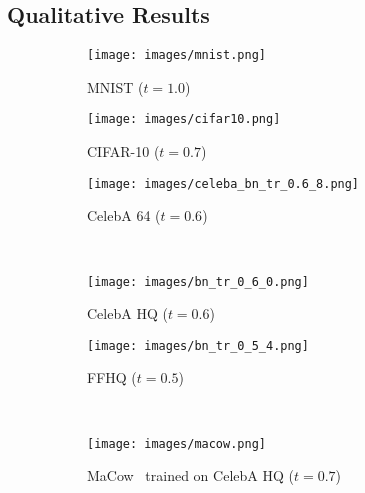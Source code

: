 \documentclass{article}
\begin{document}
\subsection{Qualitative Results}\label{sec:qual_res}
\begin{figure}[t]
\vspace{-0.5cm}
\centering
\begin{subfigure}[b]{.32\textwidth}
\centering
    \setlength{\belowcaptionskip}{1pt}
    \vspace{-0.4cm}
    \texttt{[image: images/mnist.png]}
    \caption{MNIST ($t = 1.0$)}
    \label{fig:mnist}
\end{subfigure}
\begin{subfigure}[b]{.32\textwidth}
\centering
    \setlength{\belowcaptionskip}{1pt}
    \vspace{-0.4cm}
    \texttt{[image: images/cifar10.png]}
    \caption{CIFAR-10 ($t = 0.7$)}
    \label{fig:cifar10}
\end{subfigure}
\begin{subfigure}[b]{.32\textwidth}
\centering
    \setlength{\belowcaptionskip}{1pt}
    \texttt{[image: images/celeba\_bn\_tr\_0.6\_8.png]}
    \caption{CelebA 64 ($t = 0.6$)}
    \label{fig:celeba64}
\end{subfigure} \\
\begin{subfigure}[b]{.49\textwidth}
\centering
    \setlength{\belowcaptionskip}{1pt}
    \texttt{[image: images/bn\_tr\_0\_6\_0.png]}
    \caption{CelebA HQ ($t = 0.6$)}
    \label{fig:celeba_hq}
\end{subfigure}
\begin{subfigure}[b]{.49\textwidth}
\centering
    \setlength{\belowcaptionskip}{1pt}
    \texttt{[image: images/bn\_tr\_0\_5\_4.png]}
    \caption{FFHQ ($t = 0.5$)}
    \label{fig:ffhq}
\end{subfigure} \\
\begin{subfigure}[b]{.49\textwidth}
\centering
    \setlength{\belowcaptionskip}{1pt}
    \texttt{[image: images/macow.png]}
    \caption{MaCow~\cite{ma19MaCow} trained on CelebA HQ ($t = 0.7$)}
    \label{fig:macow}
\end{subfigure}
\begin{subfigure}[b]{.49\textwidth}

\end{subfigure}
\end{figure}
\end{document}
